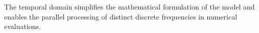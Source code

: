 %
The temporal  domain simplifies
the mathematical formulation of
the model and enables
the parallel processing of
distinct discrete frequencies in
numerical evaluations.


